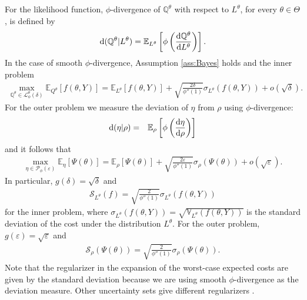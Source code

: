 \documentclass[11pt,reqno,letter]{amsart}
\theoremstyle{plain}
\theoremstyle{definition}
\numberwithin{equation}{section}
\numberwithin{theorem}{section}
\numberwithin{table}{section}
\numberwithin{figure}{section}
\begin{document}
For the likelihood function,  $\phi$-divergence of ${\mathbb Q}^\theta$ with respect to $L^\theta$, for every $\theta\in{\Theta}$, is defined by
\begin{eqnarray*}
 {\rm d}({\mathbb Q}^\theta|L^\theta)= {\mathbb E}_{L^\theta} \left[\phi \left(\frac{{\rm d}{\mathbb Q}^\theta}{{\rm d} L^\theta}\right) \right].
\end{eqnarray*}
In the case of smooth $\phi$-divergence, Assumption \ref{ass:Bayes} holds and the inner problem \cite{gotoh2026sensitivity} 
\begin{eqnarray*}
\max_{{\mathbb Q}^\theta \in {\mathcal L}^\theta_{\phi}(\delta)} {\mathbb E}_{Q^\theta} [f(\theta, Y)] 
=  {\mathbb E}_{L^\theta}[f(\theta, Y)]  + \sqrt{\frac{2\delta}{\phi''(1)}} {\sigma}_{L^\theta}(f(\theta, Y))+ o(\sqrt{\delta}).
\end{eqnarray*}
For the outer problem we measure the deviation of $\eta$ from $\rho$ using $\phi$-divergence:
\begin{eqnarray*}
{\rm d}( \eta | \rho) & = & {\mathbb E}_\rho \left[\phi\left(\frac{{\rm d}\eta}{{\rm d}\rho}\right)\right]
\end{eqnarray*}
and it follows that
\begin{eqnarray*}
\max_{\eta \in {\mathcal P}_\phi(\varepsilon)} {\mathbb E}_\eta[\Psi(\theta)] 
= {\mathbb E}_\rho[\Psi(\theta)] + \sqrt{\frac{2\varepsilon}{\phi''(1)}}\sigma_\rho(\Psi(\theta)) + o(\sqrt{\varepsilon}).
\end{eqnarray*}
In particular, $g(\delta) = \sqrt{\delta}$ and 
\begin{eqnarray*} 
{\mathcal S}_{L^\theta}(f) =  \sqrt{\frac{2}{\phi''(1)}}  {\sigma}_{L^\theta}(f(\theta, Y))
\end{eqnarray*}  
for the inner problem, where ${\sigma}_{L^\theta}(f(\theta, Y)) = \sqrt{ {\mathbb V}_{L^\theta}(f(\theta, Y))}$ is the standard deviation of the cost under the distribution $L^\theta$. For the outer problem,
$g(\varepsilon) = \sqrt{\varepsilon}$ and
\begin{eqnarray*}
{\mathcal S}_\rho(\Psi(\theta))  =\sqrt{\frac{2}{\phi''(1)}}\sigma_\rho(\Psi(\theta)).
\end{eqnarray*}
Note that the regularizer in the expansion of the worst-case expected costs are given by the standard deviation because we are using smooth $\phi$-divergence as the deviation measure. Other uncertainty sets give different regularizers \cite{gotoh2026sensitivity}.
\end{document}

